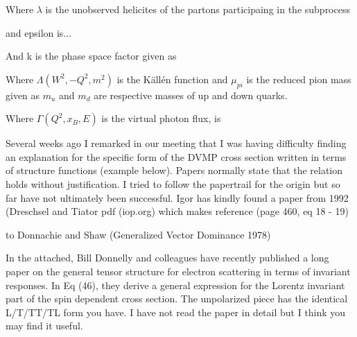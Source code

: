         
        
            Where $\lambda$ is the unobserved helicites of the partons participaing in the subprocess
            
         and epsilon is... 
            
            
            
            
         
               
            And k is the phase space factor given as 
            
                Where $\Lambda(W^2,-Q^2,m^2)$ is the Källén function and $\mu_{pi}$ is the reduced pion mass given as 
            $m_u$ and $m_d$ are respective masses of up and down quarks.
            
             Where $\Gamma (Q^2, x_B, E)$ is the virtual photon flux, is 

\fi


Several weeks ago I remarked in our meeting that I was having difficulty finding an explanation for the specific form of the DVMP cross section written in terms of structure functions (example below). Papers normally state that the relation holds without justification. I tried to follow the papertrail for the origin but so far have not ultimately been successful. Igor has kindly found a paper from 1992 (Dreschsel and Tiator pdf (iop.org) which makes reference (page 460, eq 18 - 19) \cite{Dreschsel1992ThresholdNucleons}
\cite{Bedlinskiy2014ExclusiveAl.}


to Donnachie and Shaw (Generalized Vector Dominance 1978) \cite{Donnachie1978GeneralizedDominance}


In the attached, Bill Donnelly and colleagues have recently published a long paper
on the general tensor structure for electron scattering in terms of invariant responses.
In Eq (46), they derive a general expression for the Lorentz invariant part of the spin \cite{Donnelly2023GeneralResponses}
dependent cross section.  The unpolarized piece has the identical L/T/TT/TL form you have.
I have not read the paper in detail but I think you may find it useful.



